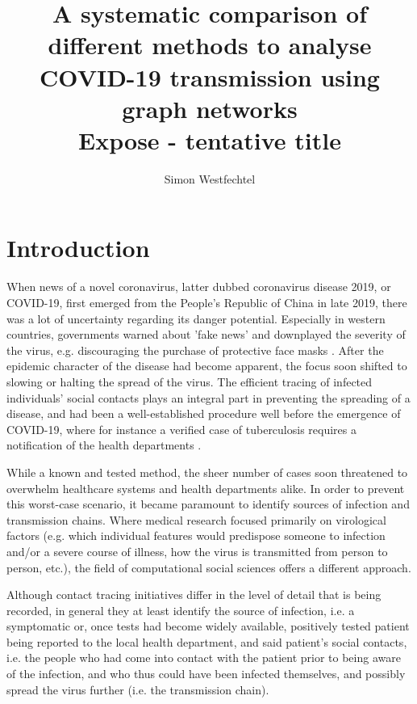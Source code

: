 \documentclass{article}
\title{
	A systematic comparison of different methods to analyse COVID-19 transmission using graph networks\\
	Expose - tentative title	
}
\author{Simon Westfechtel}
\begin{document}
	\maketitle

	\section{Introduction}
	\label{sec:Introduction}
	When news of a novel coronavirus, latter dubbed coronavirus disease 2019, or COVID-19, first emerged from the People's Republic of China in late 2019, there was a lot of uncertainty regarding its danger potential. Especially in western countries, governments warned about 'fake news' and downplayed the severity of the virus, e.g. discouraging the purchase of protective face masks \cite{osthessen_news,tagesschau_1,tagesschau_2}. After the epidemic character of the disease had become apparent, the focus soon shifted to slowing or halting the spread of the virus. The efficient tracing of infected individuals' social contacts plays an integral part in preventing the spreading of a disease, and had been a well-established procedure well before the emergence of COVID-19, where for instance a verified case of tuberculosis requires a notification of the health departments \cite{enwiki_1097839709}. 
	
	While a known and tested method, the sheer number of cases soon threatened to overwhelm healthcare systems and health departments alike. In order to prevent this worst-case scenario, it became paramount to identify sources of infection and transmission chains. Where medical research focused primarily on virological factors (e.g. which individual features would predispose someone to infection and/or a severe course of illness, how the virus is transmitted from person to person, etc.), the field of computational social sciences offers a different approach. 
	
	Although contact tracing initiatives differ in the level of detail that is being recorded, in general they at least identify the source of infection, i.e. a symptomatic or, once tests had become widely available, positively tested patient being reported to the local health department, and said patient's social contacts, i.e. the people who had come into contact with the patient prior to being aware of the infection, and who thus could have been infected themselves, and possibly spread the virus further (i.e. the transmission chain). 
	
\end{document}
